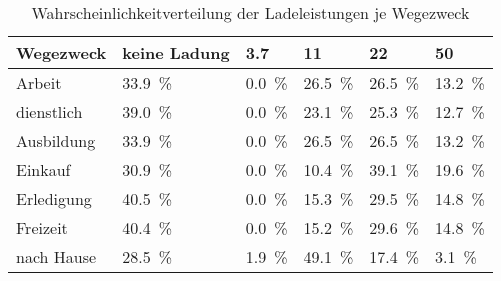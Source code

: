 {
\renewcommand{\arraystretch}{1.2}%
\begin{table}[H]
	\begin{center}
		\caption{Wahrscheinlichkeitverteilung der Ladeleistungen je Wegezweck}
		\begin{tabu} to \textwidth {X[1.2] X[1.2, r] X[1, r] X[1, r] X[1, r] X[1, r]}
			\hline
			Wegezweck  & keine Ladung        & \SI{3.7}{\kw}      & \SI{11}{\kw}        & \SI{22}{\kw}        & \SI{50}{\kw}        \\ \hline
			Arbeit     & \SI{33.9}{\percent} & \SI{0.0}{\percent} & \SI{26.5}{\percent} & \SI{26.5}{\percent} & \SI{13.2}{\percent} \\
			dienstlich & \SI{39.0}{\percent} & \SI{0.0}{\percent} & \SI{23.1}{\percent} & \SI{25.3}{\percent} & \SI{12.7}{\percent} \\
			Ausbildung & \SI{33.9}{\percent} & \SI{0.0}{\percent} & \SI{26.5}{\percent} & \SI{26.5}{\percent} & \SI{13.2}{\percent} \\
			Einkauf    & \SI{30.9}{\percent} & \SI{0.0}{\percent} & \SI{10.4}{\percent} & \SI{39.1}{\percent} & \SI{19.6}{\percent} \\
			Erledigung & \SI{40.5}{\percent} & \SI{0.0}{\percent} & \SI{15.3}{\percent} & \SI{29.5}{\percent} & \SI{14.8}{\percent} \\
			Freizeit   & \SI{40.4}{\percent} & \SI{0.0}{\percent} & \SI{15.2}{\percent} & \SI{29.6}{\percent} & \SI{14.8}{\percent} \\
			nach Hause & \SI{28.5}{\percent} & \SI{1.9}{\percent} & \SI{49.1}{\percent} & \SI{17.4}{\percent} & \SI{3.1}{\percent}  \\ \hline
		\end{tabu}
		\label{tab:WegezweckProbability2050}
	\end{center}
	\vspace{-3mm}%
\end{table}
}